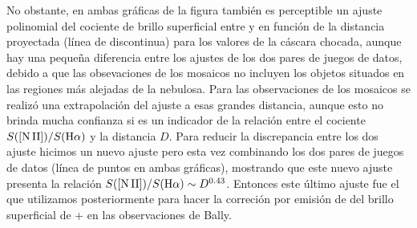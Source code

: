 No obstante, en ambas gráficas de la figura también es perceptible un ajuste polinomial del cociente de brillo superficial entre \nii{} y \ha{} en función de la distancia proyectada (línea de discontinua) para los valores de la cáscara chocada, aunque hay una pequeña diferencia entre los ajustes  de los dos pares de juegos de datos, debido a que las obsevaciones de los mosaicos no incluyen los objetos situados en las regiones más alejadas de la nebulosa. Para las observaciones de los mosaicos se realizó una extrapolación del ajuste a esas grandes distancia, aunque esto no brinda mucha confianza si es un indicador de la relación entre el cociente \(S(\mathrm{[N\,II]}{})/S(\mathrm{H}\alpha{})\) y la distancia \(D\). Para reducir la discrepancia entre los dos ajuste hicimos un nuevo ajuste pero esta vez combinando los dos pares de juegos de datos (línea de puntos en ambas gráficas), mostrando que este nuevo ajuste presenta la relación \(S(\mathrm{[N\,II]}{})/S(\mathrm{H}\alpha{}) \sim D^{0.43}\). Entonces este último ajuste fue el que utilizamos posteriormente para hacer la correción por emisión de \nii{} del brillo superficial de \nii{} + \ha{} en las observaciones de Bally.\\     

%

%
